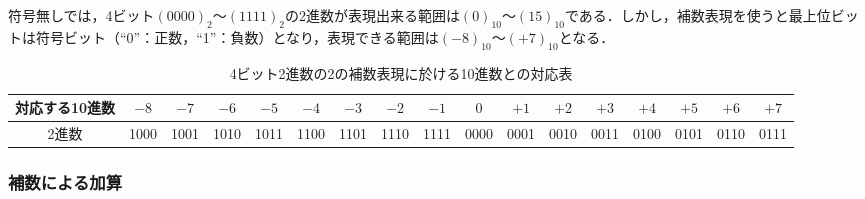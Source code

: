\newpage


符号無しでは，4ビット$(0000)_{2} ～ (1111)_{2}$の2進数が表現出来る範囲は$(0)_{10} ～ (15)_{10}$である．しかし，補数表現を使うと最上位ビットは符号ビット（“0”：正数，“1”：負数）となり，表現できる範囲は$(-8)_{10} ～ (+7)_{10}$となる．

\begin{table}[H]
	\caption{4ビット2進数の2の補数表現に於ける10進数との対応表}
	\label{tab27-4}
	\centering
	\begin{tabular}{c|cccccccccccccccc}
		\hline
		\textsf{対応する10進数} &
		$-8$ & $-7$ & $-6$ & $-5$ &
		$-4$ & $-3$ & $-2$ & $-1$ &
		$ 0$ & $+1$ & $+2$ & $+3$ &
		$+4$ & $+5$ & $+6$ & $+7$ \\
		\hline
		\textsf{2進数} &
		1000 & 1001 & 1010 & 1011 &
		1100 & 1101 & 1110 & 1111 &
		0000 & 0001 & 0010 & 0011 &
		0100 & 0101 & 0110 & 0111 \\
		\hline
	\end{tabular}
\end{table}



\subsubsection{補数による加算}\label{sec27-2-C-5}

